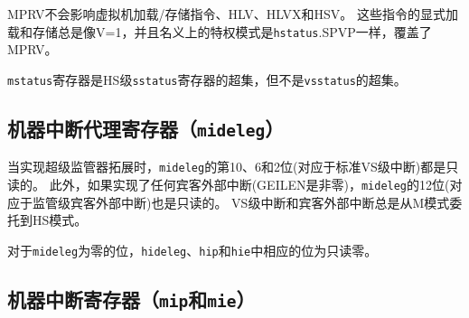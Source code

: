 MPRV不会影响虚拟机加载/存储指令、HLV、HLVX和HSV。
这些指令的显式加载和存储总是像V=1，并且名义上的特权模式是{\tt hstatus}.SPVP一样，覆盖了MPRV。

{\tt mstatus}寄存器是HS级{\tt sstatus}寄存器的超集，但不是{\tt vsstatus}的超集。

\FloatBarrier

\subsection{机器中断代理寄存器（{\tt mideleg}）}

当实现超级监管器拓展时，{\tt mideleg}的第10、6和2位(对应于标准VS级中断)都是只读的。
此外，如果实现了任何宾客外部中断(GEILEN是非零)，{\tt mideleg}的12位(对应于监管级宾客外部中断)也是只读的。
VS级中断和宾客外部中断总是从M模式委托到HS模式。

对于{\tt mideleg}为零的位，{\tt hideleg}、{\tt hip}和{\tt hie}中相应的位为只读零。

\subsection{机器中断寄存器（{\tt mip}和{\tt mie}）}


